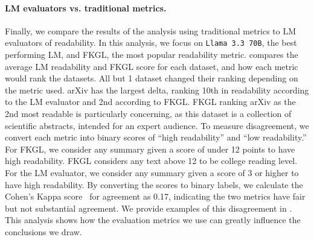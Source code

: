 


\paragraph{LM evaluators vs. traditional metrics.} Finally, we compare the results of the analysis using traditional metrics to LM evaluators of readability. In this analysis, we focus on \texttt{Llama 3.3 70B}, the best performing LM, and FKGL, the most popular readability metric.  compares the average LM readability and FKGL score for each dataset, and how each metric would rank the datasets. All but 1 dataset changed their ranking depending on the metric used. arXiv has the largest delta, ranking 10th in readability according to the LM evaluator and 2nd according to FKGL. FKGL ranking arXiv as the 2nd most readable is particularly concerning, as this dataset is a collection of scientific abstracts, intended for an expert audience.
To measure disagreement, we convert each metric into binary scores of ``high readability'' and ``low readability.'' For FKGL, we consider any summary given a score of under 12 points to have high readability. FKGL considers any text above 12 to be college reading level. For the LM evaluator, we consider any summary given a score of 3 or higher to have high readability. By converting the scores to binary labels, we calculate the Cohen's Kappa score~\cite{McHugh2012InterraterRT} for agreement as 0.17, indicating the two metrics have fair but not substantial agreement. We provide examples of this disagreement in . This analysis shows how the evaluation metrics we use can greatly influence the conclusions we draw. 




